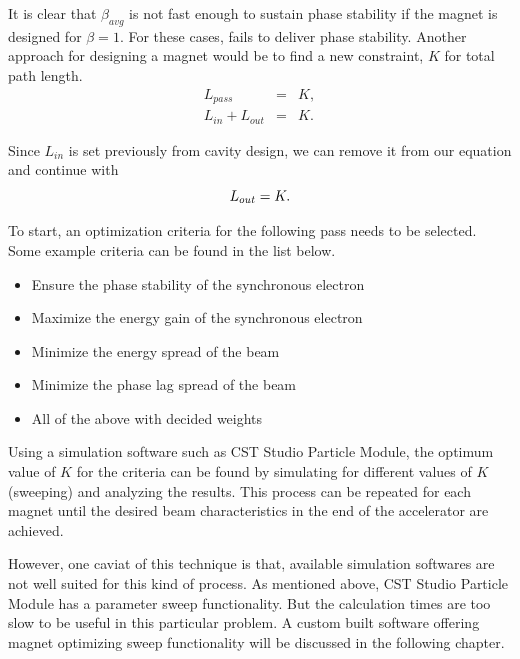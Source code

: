 \documentclass[a4paper,oneside,12pt]{report}
\numberwithin{equation}{chapter}
\begin{document}
\vspace{-40pt}
\noindent
It is clear that $\beta_{avg}$ is not fast enough to sustain phase stability if the magnet is designed for $\beta = 1$. 
For these cases,  fails to deliver phase stability.
Another approach for designing a magnet would be to find a new constraint, $K$ for total path length.
\vspace{-20pt}\begin{eqnarray}
    L_{pass} &=& K ,\\
    L_{in} + L_{out} &=& K .
\end{eqnarray}

\vspace{-40pt}
\noindent
Since $L_{in}$ is set previously from cavity design, we can remove it from our equation and continue with
\vspace{-20pt}\begin{equation} \label{eq:mag_sweep_constraint}
    L_{out} = K .
\vspace{-15pt}\end{equation}

To start, an optimization criteria for the following pass needs to be selected. 
Some example criteria can be found in the list below.
\begin{itemize}
    \item Ensure the phase stability of the synchronous electron
    \item Maximize the energy gain of the synchronous electron
    \item Minimize the energy spread of the beam
    \item Minimize the phase lag spread of the beam
    \item All of the above with decided weights
\end{itemize}

Using a simulation software such as CST Studio Particle Module, the optimum value of $K$ for the criteria can be found by simulating for different values of $K$ (sweeping) and analyzing the results.
This process can be repeated for each magnet until the desired beam characteristics in the end of the accelerator are achieved.

However, one caviat of this technique is that, available simulation softwares are not well suited for this kind of process. As mentioned above, CST Studio Particle Module has a parameter sweep functionality.
But the calculation times are too slow to be useful in this particular problem. A custom built software offering magnet optimizing sweep functionality will be discussed in the following chapter.
\end{document}
